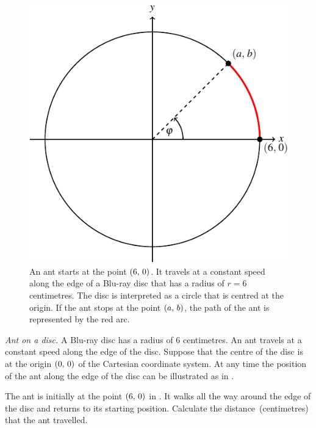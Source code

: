 \documentclass[a4paper,oneside,12pt]{article}
\begin{document}
\begin{problem}
\begin{figure}[!htbp]
\centering
\includegraphics[scale=1.1]{image/13/ant-circle.pdf}
\caption{%
  An ant starts at the point $\left\lparen{6},\, {0}\right\rparen$.  It travels at a constant
  speed along the edge of a Blu-ray disc that has a radius of $r = 6$
  centimetres.  The disc is interpreted as a circle that is centred at
  the origin.  If the ant stops at the point $\left\lparen{a},\, {b}\right\rparen$, the path
  of the ant is represented by the red arc.
}
\label{fig:trigonometric:ant_on_disc}
\end{figure}

\item\emph{Ant on a disc.}
  A Blu-ray disc has a radius of $6$ centimetres.  An ant travels at a
  constant speed along the edge of the disc.  Suppose that the centre
  of the disc is at the origin $\left\lparen{0},\, {0}\right\rparen$ of the Cartesian
  coordinate system.  At any time the position of the ant along the
  edge of the disc can be illustrated as in
  .
  \begin{packedenum}
  \item\label{subprob:trigonometric:ant_distance}
    The ant is initially at the point $\left\lparen{6},\, {0}\right\rparen$  in
    .  It walks all the way
    around the edge of the disc and returns to its starting position.
    Calculate the distance~(centimetres) that the ant travelled.


\end{packedenum}
\end{problem}
\end{document}
